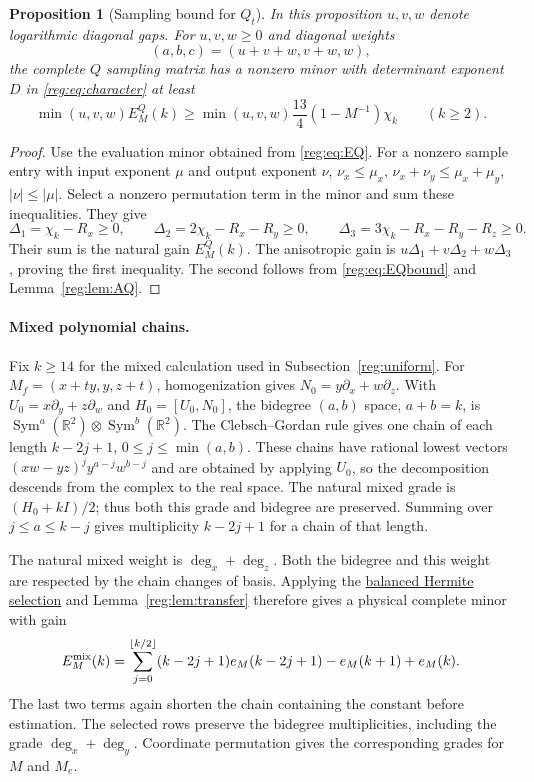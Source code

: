 \documentclass[11pt]{amsart}
\newtheorem{proposition}[theorem]{Proposition}
\theoremstyle{definition}
\theoremstyle{remark}
\numberwithin{equation}{section}
\begin{document}
\begin{proposition}[Sampling bound for \texorpdfstring{$Q_t$}{Qt}]\label{reg:prop:Q}
In this proposition $u,v,w$ denote logarithmic diagonal gaps. For $u,v,w\ge0$ and diagonal weights
\[
 (a,b,c)=(u+v+w,v+w,w),
\]
the complete $Q$ sampling matrix has a nonzero minor with determinant exponent $D$ in \eqref{reg:eq:character} at least
\begin{equation}\label{reg:eq:Qgain}
 \min(u,v,w)E^Q_M(k)\ge\min(u,v,w)\frac{13}{4}(1-M^{-1})\chi_k\qquad(k\ge2).
\end{equation}
\end{proposition}
\begin{proof}
Use the evaluation minor obtained from \eqref{reg:eq:EQ}. For a nonzero sample entry with input exponent $\mu$ and output exponent $\nu$, $\nu_x\le\mu_x$, $\nu_x+\nu_y\le\mu_x+\mu_y$, $|\nu|\le|\mu|$. Select a nonzero permutation term in the minor and sum these inequalities. They give
\[
 \Delta_1=\chi_k-R_x\ge0,\qquad \Delta_2=2\chi_k-R_x-R_y\ge0,\qquad \Delta_3=3\chi_k-R_x-R_y-R_z\ge0.
\]
Their sum is the natural gain $E^Q_M(k)$. The anisotropic gain is $u\Delta_1+v\Delta_2+w\Delta_3$, proving the first inequality. The second follows from \eqref{reg:eq:EQbound} and Lemma~\ref{reg:lem:AQ}.
\end{proof}


\paragraph{Mixed polynomial chains.}\label{reg:mixed-chains}
Fix $k\ge14$ for the mixed calculation used in Subsection~\ref{reg:uniform}.
For $M_f=(x+ty,y,z+t)$, homogenization gives $N_0=y\partial_x+w\partial_z$. With $U_0=x\partial_y+z\partial_w$ and $H_0=[U_0,N_0]$, the bidegree $(a,b)$ space, $a+b=k$, is $\operatorname{Sym}^a(\mathbb R^2)\otimes\operatorname{Sym}^b(\mathbb R^2)$. The Clebsch--Gordan rule \cite[Theorem 11.18]{EtingofSL2} gives one chain of each length $k-2j+1$, $0\le j\le\min(a,b)$. These chains have rational lowest vectors $(xw-yz)^j y^{a-j}w^{b-j}$ and are obtained by applying $U_0$, so the decomposition descends from the complex to the real space. The natural mixed grade is $(H_0+kI)/2$; thus both this grade and bidegree are preserved. Summing over $j\le a\le k-j$ gives multiplicity $k-2j+1$ for a chain of that length.

The natural mixed weight is $\deg_x+\deg_z$. Both the bidegree and this weight are respected by the chain changes of basis. Applying the \hyperref[reg:balanced-hermite]{balanced Hermite selection} and Lemma~\ref{reg:lem:transfer} therefore gives a physical complete minor with gain
\begin{equation}\label{reg:eq:Emixed}
E_M^{\rm mix}(k)=\sum_{j=0}^{\lfloor k/2\rfloor}(k-2j+1)e_M(k-2j+1)-e_M(k+1)+e_M(k).
\end{equation}
The last two terms again shorten the chain containing the constant before estimation. The selected rows preserve the bidegree multiplicities, including the grade $\deg_x+\deg_y$. Coordinate permutation gives the corresponding grades for $M$ and $M_e$.
\end{document}
